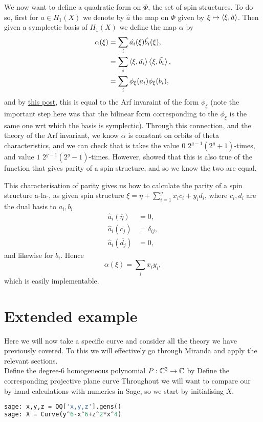 \documentclass{article}
\begin{document}
We now want to define a quadratic form on $\Phi$, the set of spin structures. To do so, first for $a \in H_1(X)$ we denote by $\hat{a}$ the map on $\Phi$ given by $\xi \mapsto \left\langle \xi, \tilde{a} \right\rangle$. Then given a symplectic basis of $H_1(X)$ we define the map $\alpha$ by 
\begin{align*}
\alpha(\xi) &= \sum_i \hat{a_i}(\xi) \hat{b_i}(\xi) , \\
&= \sum_i \left\langle \xi, \tilde{a_i} \right\rangle \left\langle \xi, \tilde{b_i} \right\rangle , \\
&= \sum_i \phi_\xi(a_i) \phi_\xi (b_i) , \\
\end{align*}
and by \href{https://math.stackexchange.com/questions/323607/arf-invariant-for-quadratic-forms}{this post}, this is equal to the Arf invaraint of the form $\phi_\xi$ (note the important step here was that the bilinear form corresponding to the $\phi_\xi$ is the same one wrt which the basis is symplectic). Through this connection, and the theory of the Arf invariant, we know $\alpha$ is constant on orbits of theta characteristics, and we can check that is takes the value $0$ $2^{g-1}(2^g+1)$-times, and value $1$ $2^{g-1}(2^g-1)$-times. However, \cite{Atiyah1971} showed that this is also true of the function that gives parity of a spin structure, and so we know the two are equal. 

This characterisation of parity gives us how to calculate the parity of a spin structure a-la-\cite{Kallel2006}, as given spin structure $\xi = \overline{\eta} + \sum_{i=1}^g x_i \overline{c}_i + y_i \overline{d_i}$, where $c_i, d_i$ are the dual basis to $a_i, b_i$ 
\begin{align*}
	\hat{a}_i(\overline{\eta}) &= 0, \\
	\hat{a}_i(\overline{c_j}) &= \delta_{ij} , \\
	\hat{a}_i(\overline{d_j}) &= 0,
\end{align*}
and likewise for $b_i$. Hence 
\[
\alpha(\xi) = \sum_i x_i y_i ,
\]
which is easily implementable. 
\section{Extended example}
Here we will now take a specific curve and consider all the theory we have previously covered. To this we will effectively go through Miranda \cite{Miranda1995} and apply the relevant sections. \\
Define the degree-$6$ homogeneous polynomial $P:\mathbb{C}^3 \to \mathbb{C}$ by 
Define the corresponding projective plane curve 
Throughout we will want to compare our by-hand calculations with numerics in Sage, so we start by initialising $X$. 
\begin{lstlisting}[language=Python,frame=single]
sage: x,y,z = QQ['x,y,z'].gens()
sage: X = Curve(y^6-x^6+z^2*x^4)
\end{lstlisting}
\end{document}
